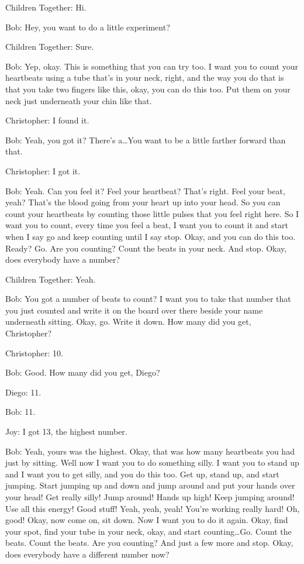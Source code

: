 Children Together: Hi.

Bob: Hey, you want to do a little experiment?

Children Together: Sure.

Bob: Yep, okay. This is something that you can try too. I want you to count your heartbeats using a tube that's in your neck, right, and the way you do that is that you take two fingers like this, okay, you can do this too. Put them on your neck just underneath your chin like that.

Christopher: I found it.

Bob: Yeah, you got it? There's a\dots You want to be a little farther forward than that.

Christopher: I got it.

Bob: Yeah. Can you feel it? Feel your heartbeat? That's right. Feel your beat, yeah? That's the blood going from your heart up into your head. So you can count your heartbeats by counting those little pulses that you feel right here. So I want you to count, every time you feel a beat, I want you to count it and start when I say go and keep counting until I say stop. Okay, and you can do this too. Ready? Go. Are you counting? Count the beats in your neck. And stop. Okay, does everybody have a number?

Children Together: Yeah.

Bob: You got a number of beats to count? I want you to take that number that you just counted and write it on the board over there beside your name underneath sitting. Okay, go. Write it down. How many did you get, Christopher?

Christopher: 10.

Bob: Good. How many did you get, Diego?

Diego: 11.

Bob: 11.

Joy: I got 13, the highest number.

Bob: Yeah, yours was the highest. Okay, that was how many heartbeats you had just by sitting. Well now I want you to do something silly. I want you to stand up and I want you to get silly, and you do this too. Get up, stand up, and start jumping. Start jumping up and down and jump around and put your hands over your head! Get really silly! Jump around! Hands up high! Keep jumping around! Use all this energy! Good stuff! Yeah, yeah, yeah! You're working really hard! Oh, good! Okay, now come on, sit down. Now I want you to do it again. Okay, find your spot, find your tube in your neck, okay, and start counting\dots Go. Count the beats. Count the beats. Are you counting? And just a few more and stop. Okay, does everybody have a different number now?

